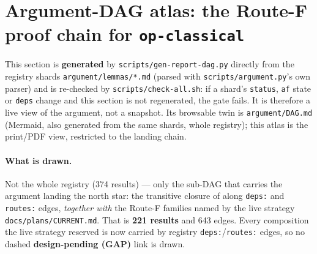 

\section{Argument-DAG atlas: the Route-F proof chain for \texorpdfstring{\texttt{op-classical}}{op-classical}}
\label{sec:argument-dag}

This section is \textbf{generated} by \texttt{scripts/gen-report-dag.py} directly from the registry shards \texttt{argument/lemmas/*.md} (parsed with \texttt{scripts/argument.py}'s own parser) and is re-checked by \texttt{scripts/check-all.sh}: if a shard's \texttt{status}, \texttt{af} state or \texttt{deps} change and this section is not regenerated, the gate fails. It is therefore a live view of the argument, not a snapshot. Its browsable twin is \texttt{argument/DAG.md} (Mermaid, also generated from the same shards, whole registry); this atlas is the print/PDF view, restricted to the landing chain.

\paragraph{What is drawn.} Not the whole registry (374 results) --- only the sub-DAG that carries the argument landing the north star: the transitive closure of  along \texttt{deps:} and \texttt{routes:} edges, \emph{together with} the Route-F families named by the live strategy \texttt{docs/plans/CURRENT.md}. That is \textbf{221 results} and 643 edges. Every composition the live strategy reserved is now carried by registry \texttt{deps:}/\texttt{routes:} edges, so no dashed \textbf{design-pending (GAP)} link is drawn.

